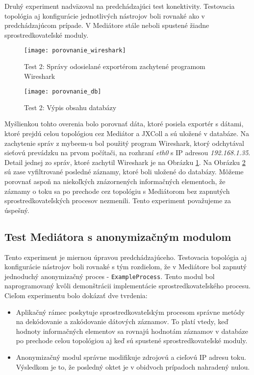 Druhý experiment nadväzoval na predchádzajúci test konektivity. Testovacia topológia aj konfigurácie 
jednotlivých nástrojov boli rovnaké ako v predchádzajúcom prípade. V Mediátore stále neboli spustené 
žiadne sprostredkovateľské moduly. 

\begin{figure}[ht!]
\centering
\texttt{[image: porovnanie\_wireshark]}
\caption{Test 2: Správy odosielané exportérom zachytené programom Wireshark}\label{o:porovnanie_wireshark}
\end{figure}

\begin{figure}[ht!]
\centering
\texttt{[image: porovnanie\_db]}
\caption{Test 2: Výpis obsahu databázy}\label{o:porovnanie_db}
\end{figure}

Myšlienkou tohto overenia bolo porovnať dáta, ktoré posiela exportér s dátami, ktoré prejdú celou topológiou
cez Mediátor a JXColl a sú uložené v databáze. Na zachytenie správ z mybeem-u bol použitý program 
Wireshark, ktorý odchytával sieťovú prevádzku na prvom počítači, na rozhraní \emph{eth0} s IP adresou 
\emph{192.168.1.35}. Detail jednej zo správ, ktoré zachytil Wireshark je na Obrázku 
\ref{o:porovnanie_wireshark}. Na Obrázku \ref{o:porovnanie_db} sú zase vyfiltrované posledné záznamy, 
ktoré boli uložené do databázy. Môžeme porovnať aspoň na niekoľkých znázornených informačných elementoch,
že záznamy o toku sa po prechode cez topológiu s Mediátorom bez zapnutých sprostredkovateľských procesov 
nezmenili. Tento experiment považujeme za úspešný.


\subsection{Test Mediátora s anonymizačným modulom}

Tento experiment je miernou úpravou predchádzajúceho. Testovacia topológia aj konfigurácie nástrojov boli 
rovnaké s tým rozdielom, že v Mediátore bol zapnutý jednoduchý anonymizačný proces - \verb|ExampleProcess|.
Tento modul bol naprogramovaný kvôli demonštrácii implementácie sprostredkovateľského procesu. Cieľom 
experimentu bolo dokázať dve tvrdenia:
\begin{itemize}
 \item Aplikačný rámec poskytuje sprostredkovateľským procesom správne metódy na dekódovanie a zakódovanie
 dátových záznamov. To platí vtedy, keď hodnoty informačných elementov sa rovnajú hodnotám záznamov
 v databáze po prechode celou topológiou aj keď sú spustené sprostredkovateľské moduly.
 \item Anonymizačný modul správne modifikuje zdrojovú a cieľovú IP adresu toku. Výsledkom je to, že 
 posledný oktet je v obidvoch prípadoch nahradený nulou.
\end{itemize}

